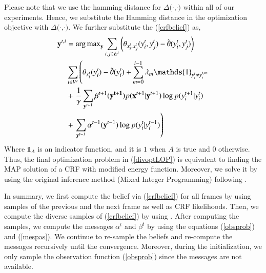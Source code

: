 Please note that we use the hamming distance for $\Delta(\cdot$,$\cdot)$ within all of our experiments. Hence, we substitute the Hamming distance in the optimization objective with $\Delta(\cdot$,$\cdot)$. We further substitute the (\ref{crfbelief})  as,
\begin{equation}\small
\begin{aligned}
\mathbf{y}^{t,i} &= \argmax_{\mathbf{y}}  \sum_{i,j \in E^t} \left( \theta_{x^t_i,x^t_j}(y^t_i,y^t_j) - \tilde{\theta}(y^t_i,y^t_j) \right) \\
&\sum_{i \in V^t} \left( \theta_{x^t_i}(y^t_i) - \tilde{\theta}(y^t_i) + \sum_{m=0}^{i-1} \lambda_m \mathds{1}_{y^{t}_i \neq y^{t,m}_i} \right. \\
&+\left.\frac{1}{\gamma}\sum_{\mathbf{y}^{t+1}} \beta^{t+1}(\mathbf{y^{t+1}}) p(\mathbf{x}^{t+1}|\mathbf{y}^{t+1}) \log p(y^{t+1}_i|y^{t}_i)  \right.\\
&+ \left.  \sum_{\mathbf{y}^{t-1}} \alpha^{t-1}(\mathbf{y}^{t-1}) \log p(y^t_i|y^{t-1}_i) \right)
\end{aligned}
\label{divoptLOP}
\end{equation}
Where $\mathds{1}_A$ is an indicator function, and it is $1$ when $A$ is true and $0$ otherwise. Thus, the final optimization problem in (\ref{divoptLOP}) is equivalent to finding the MAP solution of a CRF with modified energy function. Moreover, we solve it by using the original inference method (Mixed Integer Programming) following \cite{hemaIJRR}.

In summary, we first compute the belief via (\ref{crfbelief}) for all frames by using samples of the previous and the next frame as well as CRF likelihoods. Then, we compute the diverse samples of (\ref{crfbelief}) by using \cite{divmbest}. After computing the samples, we compute the messages $\alpha^t$ and $\beta^t$ by using the equations (\ref{obsprob}) and (\ref{mespas}). We continue to re-sample the beliefs and re-compute the messages recursively until the convergence. Moreover, during the initialization, we only sample the observation function (\ref{obsprob}) since the messages are not available.
